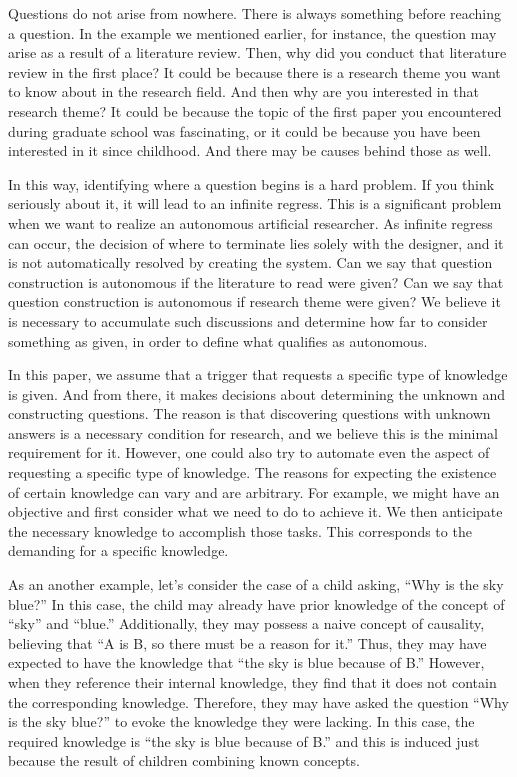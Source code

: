 \documentclass{book}
\begin{document}
Questions do not arise from nowhere. There is always something before reaching a question. In the example we mentioned earlier, for instance, the question may arise as a result of a literature review. Then, why did you conduct that literature review in the first place? It could be because there is a research theme you want to know about in the research field. And then why are you interested in that research theme? It could be because the topic of the first paper you encountered during graduate school was fascinating, or it could be because you have been interested in it since childhood. And there may be causes behind those as well.

In this way, identifying where a question begins is a hard problem. If you think seriously about it, it will lead to an infinite regress. This is a significant problem when we want to realize an autonomous artificial researcher. As infinite regress can occur, the decision of where to terminate lies solely with the designer, and it is not automatically resolved by creating the system. Can we say that question construction is autonomous if the literature to read were given? Can we say that question construction is autonomous if research theme were given? We believe it is necessary to accumulate such discussions and determine how far to consider something as given, in order to define what qualifies as autonomous.

In this paper, we assume that a trigger that requests a specific type of knowledge is given. And from there, it makes decisions about determining the unknown and constructing questions. The reason is that discovering questions with unknown answers is a necessary condition for research, and we believe this is the minimal requirement for it. However, one could also try to automate even the aspect of requesting a specific type of knowledge. The reasons for expecting the existence of certain knowledge can vary and are arbitrary. For example, we might have an objective and first consider what we need to do to achieve it. We then anticipate the necessary knowledge to accomplish those tasks. This corresponds to the demanding for a specific knowledge.

As an another example, let's consider the case of a child asking, ``Why is the sky blue?'' In this case, the child may already have prior knowledge of the concept of ``sky'' and ``blue.'' Additionally, they may possess a naive concept of causality, believing that ``A is B, so there must be a reason for it.'' Thus, they may have expected to have the knowledge that ``the sky is blue because of B.'' However, when they reference their internal knowledge, they find that it does not contain the corresponding knowledge. Therefore, they may have asked the question ``Why is the sky blue?'' to evoke the knowledge they were lacking. In this case, the required knowledge is ``the sky is blue because of B.'' and this is induced just because the result of children combining known concepts.
\end{document}
